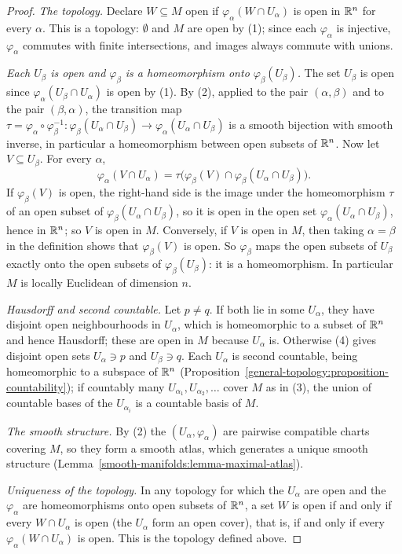 \begin{proof}
\emph{The topology.} Declare $W \subseteq M$ open if $\varphi_\alpha(W \cap U_\alpha)$ is open in $\mathbb{R}^n$ for every $\alpha$. This is a topology: $\emptyset$ and
$M$ are open by (1); since each $\varphi_\alpha$ is injective, $\varphi_\alpha$ commutes with finite intersections, and images always commute with unions.

\emph{Each $U_\beta$ is open and $\varphi_\beta$ is a homeomorphism onto $\varphi_\beta(U_\beta)$.} The set $U_\beta$ is open since
$\varphi_\alpha(U_\beta \cap U_\alpha)$ is open by (1). By (2), applied to the pair $(\alpha, \beta)$ and to the pair $(\beta, \alpha)$, the transition map
$\tau = \varphi_\alpha \circ \varphi_\beta^{-1} \colon \varphi_\beta(U_\alpha \cap U_\beta) \to \varphi_\alpha(U_\alpha \cap U_\beta)$ is a smooth bijection with
smooth inverse, in particular a homeomorphism between open subsets of $\mathbb{R}^n$. Now let $V \subseteq U_\beta$. For every $\alpha$,
\[
\varphi_\alpha(V \cap U_\alpha) = \tau\bigl(\varphi_\beta(V) \cap \varphi_\beta(U_\alpha \cap U_\beta)\bigr).
\]
If $\varphi_\beta(V)$ is open, the right-hand side is the image under the homeomorphism $\tau$ of an open subset of $\varphi_\beta(U_\alpha \cap U_\beta)$, so it
is open in the open set $\varphi_\alpha(U_\alpha \cap U_\beta)$, hence in $\mathbb{R}^n$; so $V$ is open in $M$. Conversely, if $V$ is open in $M$, then taking
$\alpha = \beta$ in the definition shows that $\varphi_\beta(V)$ is open. So $\varphi_\beta$ maps the open subsets of $U_\beta$ exactly onto the open subsets of
$\varphi_\beta(U_\beta)$: it is a homeomorphism. In particular $M$ is locally Euclidean of dimension $n$.

\emph{Hausdorff and second countable.} Let $p \neq q$. If both lie in some $U_\alpha$, they have disjoint open neighbourhoods in $U_\alpha$, which is
homeomorphic to a subset of $\mathbb{R}^n$ and hence Hausdorff; these are open in $M$ because $U_\alpha$ is. Otherwise (4) gives disjoint open sets $U_\alpha \ni p$ and
$U_\beta \ni q$. Each $U_\alpha$ is second countable, being homeomorphic to a subspace of $\mathbb{R}^n$ (Proposition~\ref{general-topology:proposition-countability});
if countably many $U_{\alpha_1}, U_{\alpha_2}, \ldots$ cover $M$ as in (3), the union of countable bases of the $U_{\alpha_i}$ is a countable basis of $M$.

\emph{The smooth structure.} By (2) the $(U_\alpha, \varphi_\alpha)$ are pairwise compatible charts covering $M$, so they form a smooth atlas, which generates a
unique smooth structure (Lemma~\ref{smooth-manifolds:lemma-maximal-atlas}).

\emph{Uniqueness of the topology.} In any topology for which the $U_\alpha$ are open and the $\varphi_\alpha$ are homeomorphisms onto open subsets of $\mathbb{R}^n$, a
set $W$ is open if and only if every $W \cap U_\alpha$ is open (the $U_\alpha$ form an open cover), that is, if and only if every $\varphi_\alpha(W \cap U_\alpha)$
is open. This is the topology defined above.
\end{proof}

